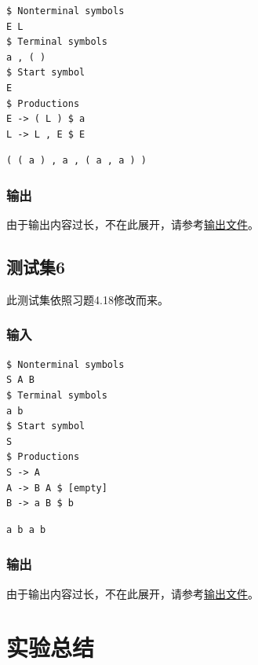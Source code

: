 \documentclass[lang=cn,11pt,a4paper,cite=authornum]{paper}
\begin{document}
\begin{code}
    \begin{verbatim}
$ Nonterminal symbols
E L
$ Terminal symbols
a , ( )
$ Start symbol
E
$ Productions
E -> ( L ) $ a
L -> L , E $ E
\end{verbatim}
\end{code}

\begin{code}
    \begin{verbatim}
( ( a ) , a , ( a , a ) )
\end{verbatim}
\end{code}

\subsubsection{输出}

由于输出内容过长，不在此展开，请参考\href{run:../test/result5.txt}{输出文件}。

\subsection{测试集6}

此测试集依照习题4.18修改而来。

\subsubsection{输入}

\begin{code}
    \begin{verbatim}
$ Nonterminal symbols
S A B
$ Terminal symbols
a b
$ Start symbol
S
$ Productions
S -> A
A -> B A $ [empty]
B -> a B $ b
\end{verbatim}
\end{code}

\begin{code}
    \begin{verbatim}
a b a b
\end{verbatim}
\end{code}

\subsubsection{输出}

由于输出内容过长，不在此展开，请参考\href{run:../test/result6.txt}{输出文件}。

\section{实验总结}
\end{document}
